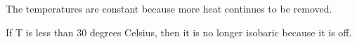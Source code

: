 The temperatures are constant because more heat continues to be removed.

If T is less than 30 degrees Celsius, then it is no longer isobaric because it is off.